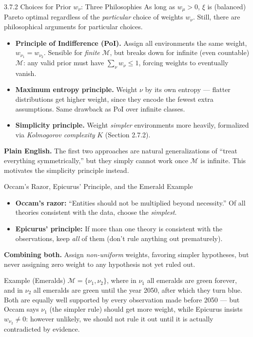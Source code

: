 \documentclass[aspectratio=169,10pt]{beamer}
\newcommand{\Mcal}{\mathcal{M}}
\begin{document}
\begin{frame}{3.7.2 Choices for Prior $w_\nu$: Three Philosophies}
  As long as $w_\mu>0$, $\xi$ is (balanced) Pareto optimal regardless of the
  \emph{particular} choice of weights $w_\nu$. Still, there are philosophical
  arguments for particular choices.

  \begin{itemize}
    \item \textbf{Principle of Indifference (PoI).} Assign all environments
      the same weight, $w_{\nu_1}=w_{\nu_2}$. Sensible for \emph{finite}
      $\Mcal$, but breaks down for infinite (even countable) $\Mcal$: any
      valid prior must have $\sum_\nu w_\nu \le 1$, forcing weights to
      eventually vanish.
    \item \textbf{Maximum entropy principle.} Weight $\nu$ by its own entropy
      --- flatter distributions get higher weight, since they encode the
      fewest extra assumptions. Same drawback as PoI over infinite classes.
    \item \textbf{Simplicity principle.} Weight \emph{simpler} environments
      more heavily, formalized via \emph{Kolmogorov complexity} $K$
      (Section 2.7.2).
  \end{itemize}
  \textbf{Plain English.} The first two approaches are natural generalizations
  of ``treat everything symmetrically,'' but they simply cannot work once
  $\Mcal$ is infinite. This motivates the simplicity principle instead.
\end{frame}

\begin{frame}{Occam's Razor, Epicurus' Principle, and the Emerald Example}
  \begin{itemize}
    \item \textbf{Occam's razor:} ``Entities should not be multiplied beyond
      necessity.'' Of all theories consistent with the data, choose the
      \emph{simplest}.
    \item \textbf{Epicurus' principle:} If more than one theory is consistent
      with the observations, keep \emph{all} of them (don't rule anything
      out prematurely).
  \end{itemize}
  \textbf{Combining both.} Assign \emph{non-uniform} weights, favoring
  simpler hypotheses, but never assigning zero weight to any hypothesis not
  yet ruled out.

  \begin{block}{Example (Emeralds)}
    $\Mcal=\{\nu_1,\nu_2\}$, where in $\nu_1$ all emeralds are green forever,
    and in $\nu_2$ all emeralds are green until the year 2050, after which
    they turn blue. Both are equally well supported by every observation
    made before 2050 --- but Occam says $\nu_1$ (the simpler rule) should get
    more weight, while Epicurus insists $w_{\nu_2}\ne 0$: however unlikely,
    we should not rule it out until it is actually contradicted by evidence.
  \end{block}
\end{frame}
\end{document}
